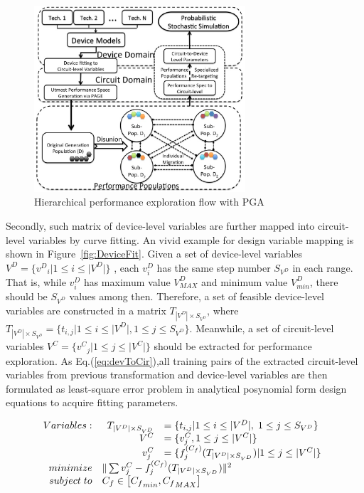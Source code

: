     \begin{figure}[t]
      \centering
      \centerline{
        \includegraphics[width=0.7\textwidth]{Fig/Chapter2/PageFlow.eps}
      }
      \caption{Hierarchical performance exploration flow with PGA} 
      \label{fig:PageFlow}
    \end{figure}

    Secondly, such matrix of device-level variables are further mapped into circuit-level variables by curve fitting. An vivid example for design variable mapping is shown in Figure~\ref{fig:DeviceFit}. Given a set of device-level variables $V^D= \{{v^D}_i| 1 \leq i \leq |V^D|\}$ , each $v^D_i$ has the same step number $S_{V^D}$ in each range. That is, while $v_i^D$ has maximum value $V^D_{MAX}$ and minimum value $V^D_{min}$, there should be $S_{V^D}$ values among then. Therefore, a set of feasible device-level variables are constructed in a matrix $T_{|V^D|\times S_{V^D}}$, where $T_{|V^D| \times S_{V^D}} = \{ t_{i,j}| 1 \leq i \leq |V^D|, 1 \leq j \leq S_{V^D} \}$. Meanwhile, a set of circuit-level variables $V^C = \{{v^C}_j| 1 \leq j \leq |V^C|\}$ should be extracted for performance exploration. As Eq.(\ref{eq:devToCir}),all training pairs of the extracted circuit-level variables from previous transformation and device-level variables are then formulated as least-square error problem in analytical posynomial form design equations to acquire fitting parameters.

    \begin{align}\label{eq:devToCir}
      \begin{array}[t]{rl}
        Variables: & \begin{array}[t]{rl}
                      T_{|V^D| \times S_{V^D}}  & = \{t_{i,j}| 1 \leq i \leq |V^D|,\; 1 \leq j \leq S_{V^D}\}   \\
                      V^C   &= \{v_j^C, 1\leq j \leq |V^C| \}   \\
                      v_j^C &= \{f_j^{(C_f)}(T_{|V^D| \times S_{V^D}})|1 \leq j \leq |V^C|\}  \\
                    \end{array} \\
         minimize & \| \sum{ v_j^C - f_j^{(C_f)}(T_{|V^D| \times S_{V^D}})}\|^2   \\
       subject\; to & C_f\in \left [{C_f}_{min}, {C_f}_{MAX} \right] 
      \end{array} 
    \end{align}

